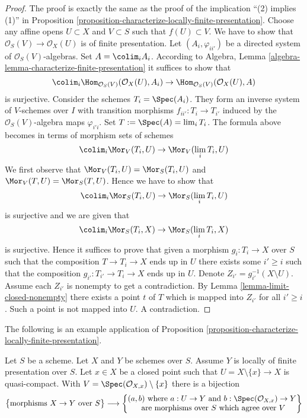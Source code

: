 \begin{proof}
The proof is exactly the same as the proof of the implication
``(2) implies (1)'' in
Proposition \ref{proposition-characterize-locally-finite-presentation}.
Choose any affine opens $U \subset X$ and $V \subset S$ such that
$f(U) \subset V$. We have to show that
$\mathcal{O}_S(V) \to \mathcal{O}_X(U)$ is of finite presentation.
Let $(A_i, \varphi_{ii'})$ be a directed system of
$\mathcal{O}_S(V)$-algebras. Set $A = \colim_i A_i$.
According to
Algebra, Lemma \ref{algebra-lemma-characterize-finite-presentation}
it suffices to show that
$$
\colim_i \Hom_{\mathcal{O}_S(V)}(\mathcal{O}_X(U), A_i) \to
\Hom_{\mathcal{O}_S(V)}(\mathcal{O}_X(U), A)
$$
is surjective. Consider the schemes $T_i = \Spec(A_i)$. They
form an inverse system of $V$-schemes over $I$
with transition morphisms $f_{ii'} : T_i \to T_{i'}$
induced by the $\mathcal{O}_S(V)$-algebra maps $\varphi_{i'i}$.
Set $T := \Spec(A) = \lim_i T_i$.
The formula above becomes in terms of morphism sets of schemes
$$
\colim_i \Mor_V(T_i, U) \to \Mor_V(\lim_i T_i, U)
$$
We first observe that
$\Mor_V(T_i, U) = \Mor_S(T_i, U)$
and
$\Mor_V(T, U) = \Mor_S(T, U)$.
Hence we have to show that
$$
\colim_i \Mor_S(T_i, U) \to
\Mor_S(\lim_i T_i, U)
$$
is surjective and we are given that
$$
\colim_i \Mor_S(T_i, X) \to
\Mor_S(\lim_i T_i, X)
$$
is surjective.
Hence it suffices to prove that given a morphism $g_i : T_i \to X$ over $S$
such that the composition $T \to T_i \to X$ ends up in $U$ there exists some
$i' \geq i$ such that the composition $g_{i'} : T_{i'} \to T_i \to X$ ends up
in $U$. Denote $Z_{i'} = g_{i'}^{-1}(X \setminus U)$.
Assume each $Z_{i'}$ is nonempty
to get a contradiction. By Lemma \ref{lemma-limit-closed-nonempty}
there exists a point $t$ of $T$ which is mapped into $Z_{i'}$ for all
$i' \geq i$. Such a point is not mapped into $U$. A contradiction.
\end{proof}

\noindent
The following is an example application of
Proposition \ref{proposition-characterize-locally-finite-presentation}.

\begin{lemma}
\label{lemma-morphism-glueing-near-closed-point}
Let $S$ be a scheme. Let $X$ and $Y$ be schemes over $S$.
Assume $Y$ is locally of finite presentation over $S$.
Let $x \in X$ be a closed point such that
$U = X \setminus \{x\} \to X$ is quasi-compact. With
$V = \Spec(\mathcal{O}_{X, x}) \setminus \{x\}$ there is
a bijection
$$
\left\{
\begin{matrix}
\text{morphisms }X \to Y\text{ over }S
\end{matrix}
\right\}
\longrightarrow
\left\{
\begin{matrix}
(a, b)\text{ where }
a : U \to Y\text{ and }b : \Spec(\mathcal{O}_{X, x}) \to Y\\
\text{ are morphisms over }S
\text{ which agree over }V
\end{matrix}
\right\}
$$
\end{lemma}

